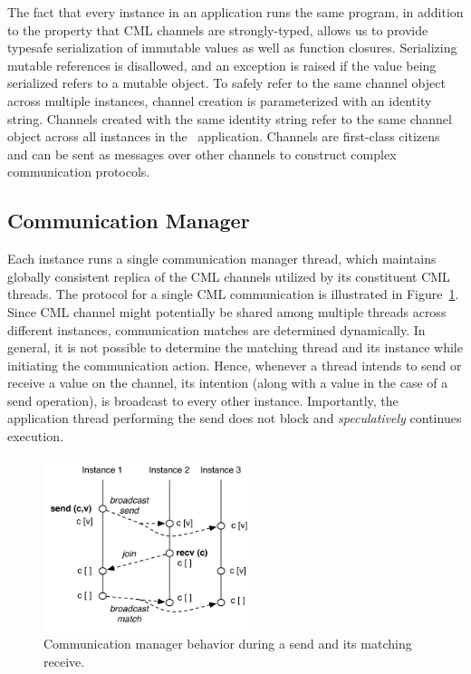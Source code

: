 The fact that every instance in an \rxcml application runs the same program, in
addition to the property that CML channels are strongly-typed, allows us to
provide typesafe serialization of immutable values as well as function
closures. Serializing mutable references is disallowed, and an exception is
raised if the value being serialized refers to a mutable object. To safely
refer to the same channel object across multiple instances, channel creation is
parameterized with an identity string. Channels created with the same identity
string refer to the same channel object across all instances in the \rxcml\
application. Channels are first-class citizens and can be sent as messages over
other channels to construct complex communication protocols.

\subsection{Communication Manager}
\label{sec:comm_mgr}

Each \rxcml instance runs a single communication manager thread, which
maintains globally consistent replica of the CML channels utilized by its
constituent CML threads. The protocol for a single CML communication is
illustrated in Figure~\ref{fig:comm_mgr}. Since CML channel might potentially
be shared among multiple threads across different instances, communication
matches are determined dynamically. In general, it is not possible to determine
the matching thread and its instance while initiating the communication action.
Hence, whenever a thread intends to send or receive a value on the channel, its
intention (along with a value in the case of a send operation), is broadcast to
every other \rxcml instance. Importantly, the application thread performing the
send does not block and \emph{speculatively} continues execution.

\begin{figure}[t]
\centering
\includegraphics[width=0.55\textwidth]{Figures/CommunicationManager}
\caption{Communication manager behavior during a send and its matching receive.}
\label{fig:comm_mgr}
\end{figure}

